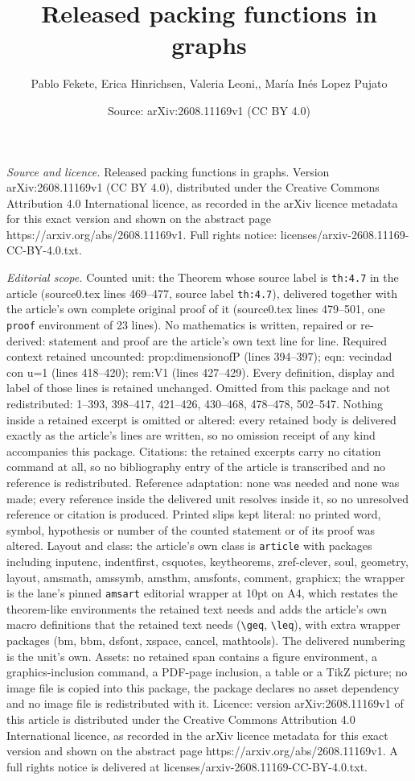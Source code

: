 \documentclass[10pt,a4paper]{amsart}
\title[Released packing functions in graphs]{Released packing functions in graphs}
\author{Pablo Fekete, Erica Hinrichsen, Valeria Leoni,, Mar\'ia In\'es Lopez Pujato}
\date{Source: arXiv:2608.11169v1 (CC BY 4.0)}
\begin{document}
\maketitle

\noindent\emph{Source and licence.} Released packing functions in graphs. Version arXiv:2608.11169v1 (CC BY 4.0), distributed under the Creative Commons Attribution 4.0 International licence, as recorded in the arXiv licence metadata for this exact version and shown on the abstract page https://arxiv.org/abs/2608.11169v1. Full rights notice: licenses/arxiv-2608.11169-CC-BY-4.0.txt.\par\smallskip

\noindent\textit{Editorial scope.} Counted unit: the Theorem whose source label is \texttt{th:4.7} in the article (source0.tex lines 469--477, source label \texttt{th:4.7}), delivered together with the article's own complete original proof of it (source0.tex lines 479--501, one \texttt{proof} environment of 23 lines). No mathematics is written, repaired or re-derived: statement and proof are the article's own text line for line. Required context retained uncounted: prop:dimensionofP (lines 394--397); eqn: vecindad con u=1 (lines 418--420); rem:V1 (lines 427--429). Every definition, display and label of those lines is retained unchanged. Omitted from this package and not redistributed: 1--393, 398--417, 421--426, 430--468, 478--478, 502--547. Nothing inside a retained excerpt is omitted or altered: every retained body is delivered exactly as the article's lines are written, so no omission receipt of any kind accompanies this package. Citations: the retained excerpts carry no citation command at all, so no bibliography entry of the article is transcribed and no reference is redistributed. Reference adaptation: none was needed and none was made; every reference inside the delivered unit resolves inside it, so no unresolved reference or citation is produced. Printed slips kept literal: no printed word, symbol, hypothesis or number of the counted statement or of its proof was altered. Layout and class: the article's own class is \texttt{article} with packages including inputenc, indentfirst, csquotes, keytheorems, zref-clever, soul, geometry, layout, amsmath, amssymb, amsthm, amsfonts, comment, graphicx; the wrapper is the lane's pinned \texttt{amsart} editorial wrapper at 10pt on A4, which restates the theorem-like environments the retained text needs and adds the article's own macro definitions that the retained text needs (\texttt{\textbackslash geq}, \texttt{\textbackslash leq}), with extra wrapper packages (bm, bbm, dsfont, xspace, cancel, mathtools). The delivered numbering is the unit's own. Assets: no retained span contains a figure environment, a graphics-inclusion command, a PDF-page inclusion, a table or a TikZ picture; no image file is copied into this package, the package declares no asset dependency and no image file is redistributed with it. Licence: version arXiv:2608.11169v1 of this article is distributed under the Creative Commons Attribution 4.0 International licence, as recorded in the arXiv licence metadata for this exact version and shown on the abstract page https://arxiv.org/abs/2608.11169v1. A full rights notice is delivered at licenses/arxiv-2608.11169-CC-BY-4.0.txt. 
\end{document}
